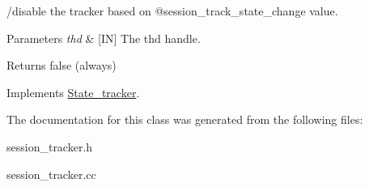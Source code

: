 /disable the tracker based on @session\+\_\+track\+\_\+state\+\_\+change value.


\begin{DoxyParams}{Parameters}
{\em thd} & \mbox{[}IN\mbox{]} The thd handle. \\
\hline
\end{DoxyParams}
\begin{DoxyReturn}{Returns}
false (always) 
\end{DoxyReturn}


Implements \mbox{\hyperlink{classState__tracker_a74ffdcb79733e8d31e9fe2dcae346022}{State\+\_\+tracker}}.



The documentation for this class was generated from the following files\+:\begin{DoxyCompactItemize}
\item 
session\+\_\+tracker.\+h\item 
session\+\_\+tracker.\+cc\end{DoxyCompactItemize}
